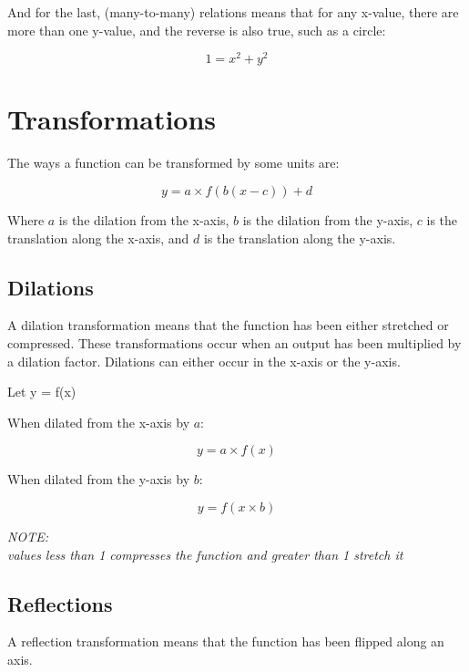 \documentclass{book}
\newenvironment{note}{\begin{center}\em NOTE:\\}{\end{center}}
\begin{document}
And for the last, (many-to-many) relations means that for any x-value, there are more than one y-value, and the reverse is also true, such as a circle:

\begin{center}
	\[1 = x^2 + y^2\]
	\begin{center}
	\end{center}
\end{center}




\chapter{Transformations}
The ways a function can be transformed by some units are:

\[
	y = a \times f(b(x - c)) + d
\]

Where $a$ is the dilation from the x-axis, $b$ is the dilation from the y-axis, $c$ is the translation along the x-axis, and $d$ is the translation along the y-axis.



\section{Dilations}
A dilation transformation means that the function has been either stretched or compressed.  These transformations occur when an output has been multiplied by a dilation factor.  Dilations can either occur in the x-axis or the y-axis.

Let y = f(x)

When dilated from the x-axis by $a$:

\[
	y = a \times f(x)
\]

When dilated from the y-axis by $b$:

\[
	y = f(x \times b)
\]

\begin{note}
	values less than 1 compresses the function and greater than 1 stretch it
\end{note}



\section{Reflections}
A reflection transformation means that the function has been flipped along an axis.
\end{document}
